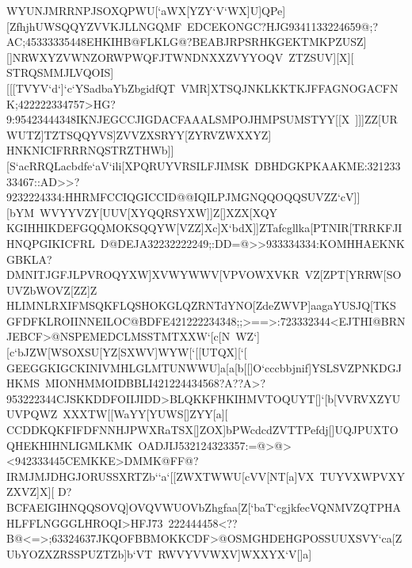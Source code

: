 {{ \hbox{WYUNJMRRNPJSOXQPWU[`aWX[YZY`V`WX]U]QPe][ZfhjhUWSQQYZVVKJLLNGQMF%
 EDCEKONGC?HJG9341133224659@;?AC;45333335448EHKIHB@FLKLG@?BEABJRPSRHKGEKTMKPZUSZ][]NRWXYZVWNZORWPWQFJTWNDNXXZVYYOQV%
 ZTZSUV][X][}
 \hbox{STRQSMMJLVQOIS][[[TVYV`d`]`c`YSadbaYbZbgidfQT%
 VMR]XTSQJNKLKKTKJFFAGNOGACFNK;422222334757>HG?9:95423444348IKNJEGCCJIGDACFAAALSMPOJHMPSUMSTYY[[X%
 ]]]ZZ[URWUTZ]TZTSQQYVS]ZVVZXSRYY[ZYRVZWXXYZ]}
 \hbox{HNKNICIFRRRNQSTRZTHWb]][S`acRRQLacbdfe`aV`ili[XPQRUYVRSILFJIMSK%
 DBHDGKPKAAKME:32123333467::AD>>?9232224334:HHRMFCCIQGICCID@@IQILPJMGNQQOQQSUVZZ`cV]][bYM%
 WVYYVZY[UUV[XYQQRSYXW]]Z[]XZX[XQY}
 \hbox{KGIHHIKDEFGQQMOKSQQYW[VZZ]Xc]X`bdX]]ZTafcgllka[PTNIR[TRRKFJIHNQPGIKICFRL%
 D@DEJA32232222249;:DD=@>>933334334:KOMHHAEKNKGBKLA?DMNITJGFJLPVROQYXW]XVWYWWV[VPVOWXVKR%
 VZ[ZPT[YRRW[SOUVZbWOVZ[ZZ]Z}
 \hbox{HLIMNLRXIFMSQKFLQSHOKGLQZRNTdYNO[ZdeZWVP]aagaYUSJQ[TKS%
 GFDFKLROIINNEILOC@BDFE421222234348;;>==>:723332344<EJTHI@BRNJEBCF>@NSPEMEDCLMSSTMTXXW`[c[N%
 WZ`][c`bJZW[WSOXSU[YZ[SXWV]WYW[`[[UTQX][`[}
 \hbox{GEEGGKIGCKINIVMHLGLMTUNWWU]a[a[b[[]O`cccbbjnif]YSLSVZPNKDGJHKMS%
 MIONHMMOIDBBLI421224434568?A??A>?953222344CJSKKDDFOIIJIDD>BLQKKFHKIHMVTOQUYT[]`[b[VVRVXZYUUVPQWZ%
 XXXTW[[WaYY[YUWS[]ZYY[a][}
 \hbox{CCDDKQKFIFDFNNHJPWXRaTSX[]ZOX]bPWcdcdZVTTPefdj[]UQJPUXTOQHEKHIHNLIGMLKMK%
 OADJIJ532124323357:=@>@><942333445CEMKKE>DMMK@FF@?IRMJMJDHGJORUSSXRTZb``a`[[ZWXTWWU[cVV[NT[a]VX%
 TUYVXWPVXYZXVZ]X][}
 \hbox{D?BCFAEIGIHNQQSOVQ]OVQVWUOVbZhgfaa[Z[`baT`cgjkfecVQNMVZQTPHAHLFFLNGGGLHROQI>HFJ73%
 222444458<??B@<=>;63324637JKQOFBBMOKKCDF>@OSMGHDEHGPOSSUUXSVY`ca[ZUbYOZXZRSSPUZTZb]b`VT%
 RWVYVVWXV]WXXYX`V[]a]}
}}
